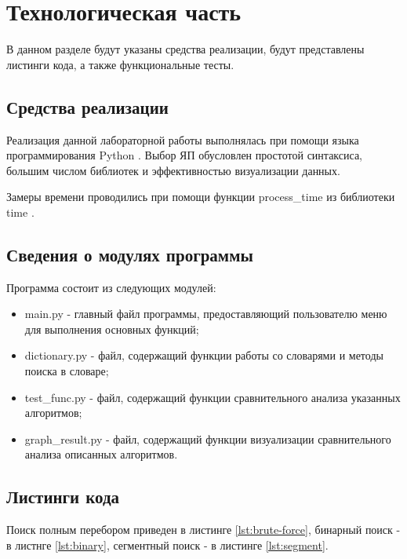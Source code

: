 \chapter{Технологическая часть}

В данном разделе будут указаны средства реализации, будут представлены листинги кода, а также функциональные тесты.

\section{Средства реализации}

Реализация данной лабораторной работы выполнялась при помощи языка программирования Python \cite{python}. Выбор ЯП обусловлен простотой синтаксиса, большим числом библиотек и эффективностью визуализации данных.

Замеры времени проводились при помощи функции process\_time из библиотеки time \cite{python-time}.

\section{Сведения о модулях программы}

Программа состоит из следующих модулей:

\begin{itemize}
	\item main.py - главный файл программы, предоставляющий пользователю меню для выполнения основных функций;
	\item dictionary.py - файл, содержащий функции работы со словарями и методы поиска в словаре;
	\item test\_func.py - файл, содержащий функции сравнительного анализа указанных алгоритмов;
	\item graph\_result.py - файл, содержащий функции визуализации сравнительного анализа описанных алгоритмов.
\end{itemize}

\section{Листинги кода}

Поиск полным перебором приведен в листинге \ref{lst:brute-force}, бинарный поиск - в листнге \ref{lst:binary}, сегментный поиск - в листинге \ref{lst:segment}.

